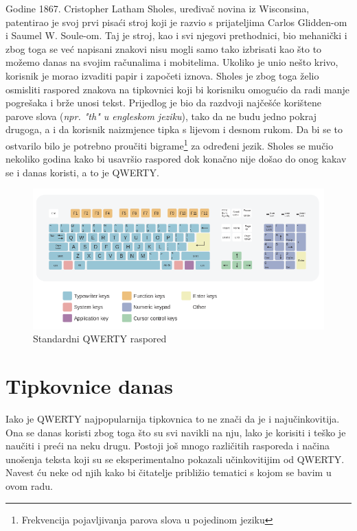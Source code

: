 \documentclass[times, utf8, zavrsni]{fer}
\begin{document}
Godine 1867. Cristopher Latham Sholes, uređivač novina iz Wisconsina, patentirao je svoj prvi pisaći stroj koji je razvio s prijateljima Carlos Glidden-om i Saumel W. Soule-om. Taj je stroj, kao i svi njegovi prethodnici, bio mehanički i zbog toga se već napisani znakovi nisu mogli samo tako izbrisati kao što to možemo danas na svojim računalima i mobitelima. Ukoliko je unio nešto krivo, korisnik je morao izvaditi papir i započeti iznova. Sholes je zbog toga želio osmisliti raspored znakova na tipkovnici koji bi korisniku omogućio da radi manje pogrešaka i brže unosi tekst. Prijedlog je bio da razdvoji najčešće korištene parove slova (\emph{npr. "th" u engleskom jeziku}), tako da ne budu jedno pokraj drugoga, a i da korisnik naizmjence tipka s lijevom i desnom rukom. Da bi se to ostvarilo bilo je potrebno proučiti bigrame\footnote{Frekvencija pojavljivanja parova slova u pojedinom jeziku} za određeni jezik. Sholes se mučio nekoliko godina kako bi usavršio raspored dok konačno nije došao do onog kakav se i danas koristi, a to je QWERTY.

\begin{figure}[htb]
\centering
\includegraphics[width=12cm]{img/qwerty.png}
\caption{Standardni QWERTY raspored}
\label{fig:qwerty}
\end{figure}

\section{Tipkovnice danas}
Iako je QWERTY najpopularnija tipkovnica to ne znači da je i najučinkovitija. Ona se danas koristi zbog toga što su svi navikli na nju, lako je korisiti i teško je naučiti i preći na neku drugu. Postoji još mnogo različitih rasporeda i načina unošenja teksta koji su se eksperimentalno pokazali učinkovitijim od QWERTY. Navest ću neke od njih kako bi čitatelje približio tematici s kojom se bavim u ovom radu.
\end{document}
